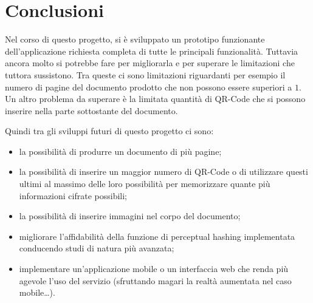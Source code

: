 \def \ti{\textit}
\def \bf{\textbf}

\chapter{Conclusioni}
	\label{cap:conclusioni}
Nel corso di questo progetto, si è sviluppato un prototipo funzionante dell'applicazione richiesta completa di tutte le principali funzionalità. Tuttavia ancora molto si potrebbe fare per migliorarla e per superare le limitazioni che tuttora sussistono. Tra queste ci sono limitazioni riguardanti per esempio il numero di pagine del documento prodotto che non possono essere superiori a $1$. Un altro problema da superare è la limitata quantità di QR-Code che si possono inserire nella parte sottostante del documento.

Quindi tra gli sviluppi futuri di questo progetto ci sono:
\begin{itemize}
	\item la possibilità di produrre un documento di più pagine;
	\item la possibilità di inserire un maggior numero di QR-Code o di utilizzare questi ultimi al massimo delle loro possibilità per memorizzare quante più informazioni cifrate possibili;
	\item la possibilità di inserire immagini nel corpo del documento;
	\item migliorare l'affidabilità della funzione di perceptual hashing implementata conducendo studi di natura più avanzata;
	\item implementare un'applicazione mobile o un interfaccia web che renda più agevole l'uso del servizio (sfruttando magari la realtà aumentata nel caso mobile\ldots).
\end{itemize}